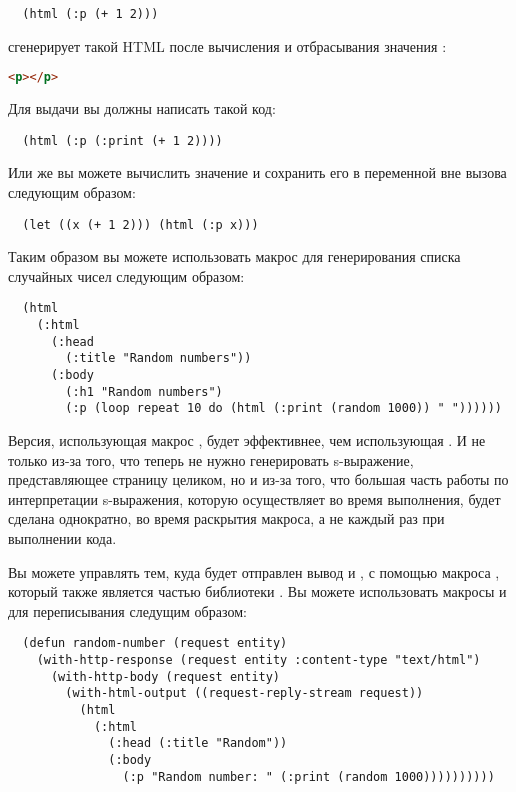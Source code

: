 \begin{lstlisting}
  (html (:p (+ 1 2)))
\end{lstlisting}

сгенерирует такой HTML после вычисления и отбрасывания значения :

\begin{lstlisting}[language=HTML]
  <p></p>
\end{lstlisting}

Для выдачи  вы должны написать такой код:

\begin{lstlisting}
  (html (:p (:print (+ 1 2))))
\end{lstlisting}

Или же вы можете вычислить значение и сохранить его в переменной вне вызова 
следующим образом:

\begin{lstlisting}
  (let ((x (+ 1 2))) (html (:p x)))
\end{lstlisting}

Таким образом вы можете использовать макрос  для генерирования списка случайных
чисел следующим образом:

\begin{lstlisting}
  (html
    (:html
      (:head
        (:title "Random numbers"))
      (:body 
        (:h1 "Random numbers")
        (:p (loop repeat 10 do (html (:print (random 1000)) " "))))))
\end{lstlisting}

Версия, использующая макрос , будет эффективнее, чем использующая
. И не только из-за того, что теперь не нужно генерировать s-выражение,
представляющее страницу целиком, но и из-за того, что большая часть работы по
интерпретации s-выражения, которую  осуществляет во время выполнения,
будет сделана однократно, во время раскрытия макроса, а не каждый раз при выполнении кода.

Вы можете управлять тем, куда будет отправлен вывод  и , с
помощью макроса , который также является частью библиотеки
. Вы можете использовать макросы  и  для
переписывания  следущим образом:

\begin{lstlisting}
  (defun random-number (request entity)
    (with-http-response (request entity :content-type "text/html")
      (with-http-body (request entity)
        (with-html-output ((request-reply-stream request))
          (html
            (:html
              (:head (:title "Random"))
              (:body
                (:p "Random number: " (:print (random 1000))))))))))
\end{lstlisting}

